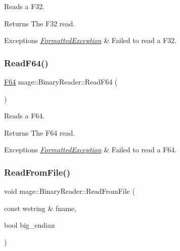 Reads a {\ttfamily F32}.

\begin{DoxyReturn}{Returns}
The {\ttfamily F32} read. 
\end{DoxyReturn}

\begin{DoxyExceptions}{Exceptions}
{\em \hyperlink{structmage_1_1_formatted_exception}{Formatted\+Exception}} & Failed to read a {\ttfamily F32}. \\
\hline
\end{DoxyExceptions}
\hypertarget{classmage_1_1_binary_reader_a37887a659040c4a3b495eef9376352d0}{}\label{classmage_1_1_binary_reader_a37887a659040c4a3b495eef9376352d0} 
\subsubsection{\texorpdfstring{Read\+F64()}{ReadF64()}}
{\footnotesize\ttfamily \hyperlink{namespacemage_ad26233bbec640deda836e572c1a23708}{F64} mage\+::\+Binary\+Reader\+::\+Read\+F64 (\begin{DoxyParamCaption}{ }\end{DoxyParamCaption})\hspace{0.3cm}{\ttfamily [protected]}}

Reads a {\ttfamily F64}.

\begin{DoxyReturn}{Returns}
The {\ttfamily F64} read. 
\end{DoxyReturn}

\begin{DoxyExceptions}{Exceptions}
{\em \hyperlink{structmage_1_1_formatted_exception}{Formatted\+Exception}} & Failed to read a {\ttfamily F64}. \\
\hline
\end{DoxyExceptions}
\hypertarget{classmage_1_1_binary_reader_aa9cc5e2bd41cd5ae5ee421ee9a1e10b2}{}\label{classmage_1_1_binary_reader_aa9cc5e2bd41cd5ae5ee421ee9a1e10b2} 
\subsubsection{\texorpdfstring{Read\+From\+File()}{ReadFromFile()}}
{\footnotesize\ttfamily void mage\+::\+Binary\+Reader\+::\+Read\+From\+File (\begin{DoxyParamCaption}\item[{const wstring \&}]{fname,  }\item[{bool}]{big\+\_\+endian }\end{DoxyParamCaption})}

